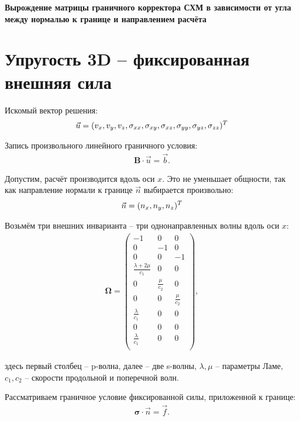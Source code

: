 \begin{center}
	\Large\textbf{{{Вырождение матрицы граничного корректора СХМ в зависимости от угла между нормалью к границе и направлением расчёта}}}
\end{center}

\section{Упругость 3D -- фиксированная внешняя сила}
Искомый вектор решения:
\begin{eqnarray}
	\vec{u}=(v_x,v_y,v_z,\sigma_{xx},\sigma_{xy},\sigma_{xz},\sigma_{yy},\sigma_{yz},\sigma_{zz})^{\small{T}}
\end{eqnarray}

Запись произвольного линейного граничного условия:
\begin{eqnarray}
\label{boundary_condition}
	\mathbf{B} \cdot \vec{u} = \vec{b}.
\end{eqnarray}

Допустим, расчёт производится вдоль оси $x$. Это не уменьшает общности, так как направление нормали к границе $\vec{n}$ выбирается произвольно:
\begin{eqnarray}
	\vec{n} = (n_x, n_y, n_z)^{\small{T}}
\end{eqnarray}

Возьмём три внешних инварианта -- три однонаправленных волны вдоль оси $x$:
\begin{align}
	\mathbf{\Omega} =
	\left( \begin{array}{cccccccccccc}
	-1 & 0  &  0 \\
	 0 & -1 &  0 \\
	 0 &  0 & -1 \\
	\frac{\lambda+2\mu}{c_1} & 0 & 0 \\
	0 & \frac{\mu}{c_2} & 0 \\
	0 & 0 & \frac{\mu}{c_2} \\
	\frac{\lambda}{c_1} & 0 & 0 \\
	0 & 0 & 0 \\
	\frac{\lambda}{c_1} & 0 & 0 \\
	\end{array} \right),
\end{align} 

здесь первый столбец -- p-волна, далее -- две s-волны, $\lambda, \mu$ -- параметры Ламе, $c_1, c_2$ -- скорости продольной и поперечной волн.

Рассматриваем граничное условие фиксированной силы, приложенной к границе:
\begin{eqnarray}
\label{fixed_force_global}
	\mathbf{\sigma} \cdot \vec{n} = \vec{f}.
\end{eqnarray}

